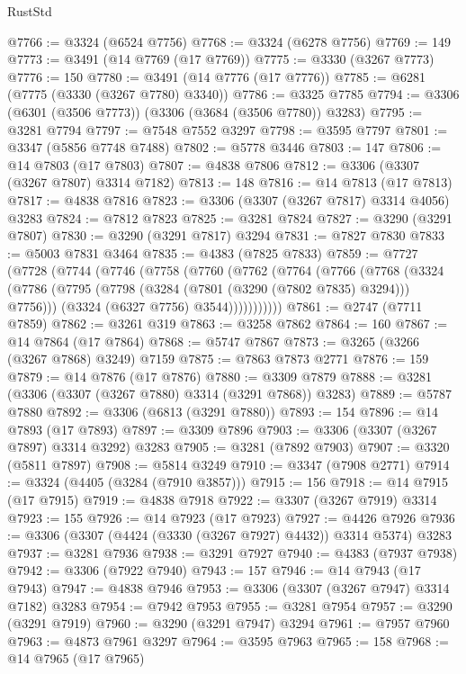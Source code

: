 \begin{lexlean}{RustStd}
\begin{coremodule}
@7766 := @3324 (@6524 @7756)
@7768 := @3324 (@6278 @7756)
@7769 := 149
@7773 := @3491 (@14 @7769 (@17 @7769))
@7775 := @3330 (@3267 @7773)
@7776 := 150
@7780 := @3491 (@14 @7776 (@17 @7776))
@7785 := @6281 (@7775 (@3330 (@3267 @7780) @3340))
@7786 := @3325 @7785
@7794 := @3306 (@6301 (@3506 @7773)) (@3306 (@3684 (@3506 @7780)) @3283)
@7795 := @3281 @7794
@7797 := @7548 @7552 @3297
@7798 := @3595 @7797
@7801 := @3347 (@5856 @7748 @7488)
@7802 := @5778 @3446
@7803 := 147
@7806 := @14 @7803 (@17 @7803)
@7807 := @4838 @7806
@7812 := @3306 (@3307 (@3267 @7807) @3314 @7182)
@7813 := 148
@7816 := @14 @7813 (@17 @7813)
@7817 := @4838 @7816
@7823 := @3306 (@3307 (@3267 @7817) @3314 @4056) @3283
@7824 := @7812 @7823
@7825 := @3281 @7824
@7827 := @3290 (@3291 @7807)
@7830 := @3290 (@3291 @7817) @3294
@7831 := @7827 @7830
@7833 := @5003 @7831 @3464
@7835 := @4383 (@7825 @7833)
@7859 := @7727
    (@7728
      (@7744
        (@7746
          (@7758
            (@7760
              (@7762
                (@7764
                  (@7766
                    (@7768
                      (@3324
                        (@7786 (@7795 (@7798 (@3284 (@7801 (@3290 (@7802 @7835) @3294))) @7756)))
                        (@3324 (@6327 @7756) @3544)))))))))))
@7861 := @2747 (@7711 @7859)
@7862 := @3261 @319
@7863 := @3258 @7862
@7864 := 160
@7867 := @14 @7864 (@17 @7864)
@7868 := @5747 @7867
@7873 := @3265 (@3266 (@3267 @7868) @3249) @7159
@7875 := @7863 @7873 @2771
@7876 := 159
@7879 := @14 @7876 (@17 @7876)
@7880 := @3309 @7879
@7888 := @3281 (@3306 (@3307 (@3267 @7880) @3314 (@3291 @7868)) @3283)
@7889 := @5787 @7880
@7892 := @3306 (@6813 (@3291 @7880))
@7893 := 154
@7896 := @14 @7893 (@17 @7893)
@7897 := @3309 @7896
@7903 := @3306 (@3307 (@3267 @7897) @3314 @3292) @3283
@7905 := @3281 (@7892 @7903)
@7907 := @3320 (@5811 @7897)
@7908 := @5814 @3249
@7910 := @3347 (@7908 @2771)
@7914 := @3324 (@4405 (@3284 (@7910 @3857)))
@7915 := 156
@7918 := @14 @7915 (@17 @7915)
@7919 := @4838 @7918
@7922 := @3307 (@3267 @7919) @3314
@7923 := 155
@7926 := @14 @7923 (@17 @7923)
@7927 := @4426 @7926
@7936 := @3306 (@3307 (@4424 (@3330 (@3267 @7927) @4432)) @3314 @5374) @3283
@7937 := @3281 @7936
@7938 := @3291 @7927
@7940 := @4383 (@7937 @7938)
@7942 := @3306 (@7922 @7940)
@7943 := 157
@7946 := @14 @7943 (@17 @7943)
@7947 := @4838 @7946
@7953 := @3306 (@3307 (@3267 @7947) @3314 @7182) @3283
@7954 := @7942 @7953
@7955 := @3281 @7954
@7957 := @3290 (@3291 @7919)
@7960 := @3290 (@3291 @7947) @3294
@7961 := @7957 @7960
@7963 := @4873 @7961 @3297
@7964 := @3595 @7963
@7965 := 158
@7968 := @14 @7965 (@17 @7965)

\end{coremodule}
\end{lexlean}
